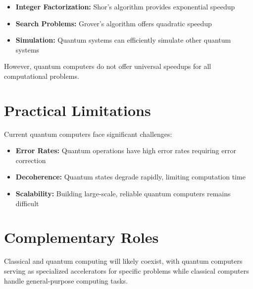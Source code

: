 \begin{itemize}
    \item \textbf{Integer Factorization:} Shor's algorithm provides exponential speedup
    
    \item \textbf{Search Problems:} Grover's algorithm offers quadratic speedup
    
    \item \textbf{Simulation:} Quantum systems can efficiently simulate other quantum systems
\end{itemize}

However, quantum computers do not offer universal speedups for all computational problems.

\section{Practical Limitations}
Current quantum computers face significant challenges:

\begin{itemize}
    \item \textbf{Error Rates:} Quantum operations have high error rates requiring error correction
    
    \item \textbf{Decoherence:} Quantum states degrade rapidly, limiting computation time
    
    \item \textbf{Scalability:} Building large-scale, reliable quantum computers remains difficult
\end{itemize}

\section{Complementary Roles}
Classical and quantum computing will likely coexist, with quantum computers serving as specialized accelerators for specific problems while classical computers handle general-purpose computing tasks.